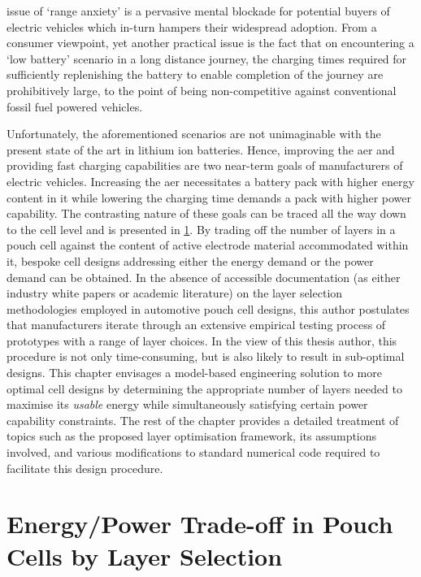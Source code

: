  issue of `range anxiety'  is a pervasive mental blockade for
potential buyers  of electric  vehicles which  in-turn hampers  their widespread
adoption. From  a consumer viewpoint,  yet another  practical issue is  the fact
that on  encountering a `low battery'  scenario in a long  distance journey, the
charging  times required  for sufficiently  replenishing the  battery to  enable
completion  of the  journey  are  prohibitively large,  to  the  point of  being
non-competitive against conventional fossil fuel powered vehicles.

Unfortunately,  the  aforementioned  scenarios  are not  unimaginable  with  the
present  state  of the  art  in  lithium  ion  batteries. Hence,  improving  the
\gls{aer} and  providing fast charging  capabilities are two near-term  goals of
manufacturers  of electric  vehicles.  Increasing the  \gls{aer} necessitates  a
battery pack with  higher energy content in it while  lowering the charging time
demands a  pack with higher  power capability.  The contrasting nature  of these
goals can  be traced  all the way  down to  the cell level  and is  presented in
\cref{sec:energypowertradeoff}. By trading  off the number of layers  in a pouch
cell  against  the content  of  active  electrode material  accommodated  within
it,  bespoke cell  designs  addressing either  the energy  demand  or the  power
demand  can  be  obtained.  In  the  absence  of  accessible  documentation  (as
either  industry white  papers or  academic literature)  on the  layer selection
methodologies employed in automotive pouch  cell designs, this author postulates
that manufacturers  iterate through  an extensive  empirical testing  process of
prototypes with  a range of  layer choices. In the  view of this  thesis author,
this  procedure is  not only  time-consuming, but  is also  likely to  result in
sub-optimal designs.  This chapter envisages a  model-based engineering solution
to more  optimal cell designs  by determining  the appropriate number  of layers
needed  to maximise  its  \emph{usable} energy  while simultaneously  satisfying
certain  power  capability constraints.  The  rest  of  the chapter  provides  a
detailed treatment of topics such  as the proposed layer optimisation framework,
its assumptions involved,  and various modifications to  standard numerical code
required to facilitate this design procedure.

\section{Energy/Power Trade-off in Pouch Cells by Layer Selection}\label{sec:energypowertradeoff}

